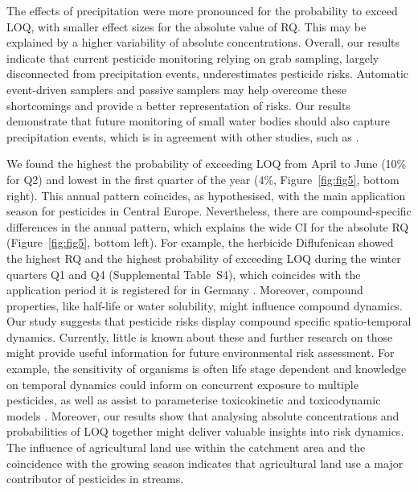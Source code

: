 \documentclass[journal=esthag,manuscript=article]{achemso}
\begin{document}
The effects of precipitation were more pronounced for the probability to exceed LOQ, with smaller effect sizes for the absolute value of RQ. 
This may be explained by a higher variability of absolute concentrations.
Overall, our results indicate that current pesticide monitoring relying on grab sampling, largely disconnected from precipitation events, underestimates pesticide risks.
Automatic event-driven samplers \citep{stehle_probabilistic_2013} and passive samplers \citep{fernandez_calibration_2014,moschet_evaluation_2015} may help overcome these shortcomings and provide a better representation of risks.
Our results demonstrate that future monitoring of small water bodies should also capture precipitation events, which is in agreement with other studies, such as \citet{lorenz_specifics_2016}. 

We found the highest the probability of exceeding LOQ from April to June (10\% for Q2) and lowest in the first quarter of the year (4\%, Figure~\ref{fig:fig5}, bottom right).
This annual pattern coincides, as hypothesised, with the main application season for pesticides in Central Europe.
Nevertheless, there are compound-specific differences in the annual pattern, which explains the wide CI for the absolute RQ (Figure~\ref{fig:fig5}, bottom left). 
For example, the herbicide Diflufenican showed the highest RQ and the highest probability of exceeding LOQ during the winter quarters Q1 and Q4 (Supplemental Table~S4), which coincides with the application period it is registered for in Germany \citep{bvl_online_2016}.
Moreover, compound properties, like half-life or water solubility, might influence compound dynamics. 
Our study suggests that pesticide risks display compound specific spatio-temporal dynamics. 
Currently, little is known about these and further research on those might provide useful information for future environmental risk assessment. 
For example, the sensitivity of organisms is often life stage dependent \citep{hutchinson1998analysis} and knowledge on temporal dynamics could inform on concurrent exposure to multiple pesticides, as well as assist to parameterise toxicokinetic and toxicodynamic models \citep{ashauer2016modelling}. 
Moreover, our results show that analysing absolute concentrations and probabilities of LOQ together might deliver valuable insights into risk dynamics.
The influence of agricultural land use within the catchment area and the coincidence with the growing season indicates that agricultural land use a major contributor of pesticides in streams. 
\end{document}
